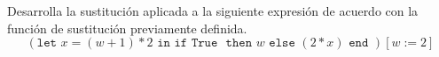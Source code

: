     \begin{exercise}
        Desarrolla la sustitución aplicada a la siguiente expresión de acuerdo con la función de sustitución previamente definida.
        	\[
          	  (\texttt{let } x = (w + 1) * 2 \texttt{ in} \texttt{ if } \texttt{True } \texttt{ then } w \texttt{ else } (2 * x) \texttt{ end })[w:=2]
        	\]


\end{exercise}

